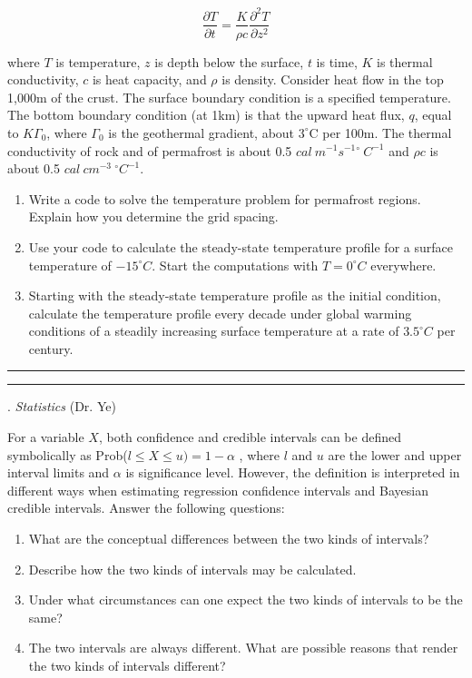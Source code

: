 \documentclass [11point]{article}
\begin{document}
$$\frac{\partial T}{\partial t} = \frac{K}{\rho c} \frac{\partial^2 T}{\partial z^2} $$

where $T$ is temperature, $z$ is depth below the surface, $t$ is time, $K$ is thermal conductivity,
$c$ is heat capacity, and $\rho$ is density. Consider heat flow in the top 1,000m of the crust. The
surface boundary condition is a specified temperature. The bottom boundary condition (at
1km) is that the upward heat flux, $q$, equal to $K \Gamma_0$, where $\Gamma_0$ is the geothermal gradient, about $3^\circ$C per 100m. The thermal conductivity of rock and of permafrost is about 0.5 $cal~m^{-1} s^{-1} {}^\circ~C^{-1}$ and $\rho c$ is about 0.5 $cal~cm^{-3}~{}^\circ C^{-1}$.

\begin{enumerate}
\item Write a code to solve the temperature problem for permafrost regions. Explain
how you determine the grid spacing.
\item Use your code to calculate the steady-state temperature profile for a surface
temperature of $-15^\circ C$. Start the computations with $T=0^\circ C$ everywhere.
\item Starting with the steady-state temperature profile as the initial condition, calculate
the temperature profile every decade under global warming conditions of a
steadily increasing surface temperature at a rate of $3.5^\circ C$ per century.
\end{enumerate}


\bigskip
\hrule 

\pagebreak
\hrule 
{}. \textit{Statistics} (Dr. Ye)

\bigskip
For a variable $X$, both confidence and credible intervals can be defined symbolically as Prob($l \le X \le u) =  1 - \alpha$ , where $l$ and $u$ are the lower and upper interval limits and $\alpha$ is significance level. However, the definition is interpreted in different ways when estimating regression confidence intervals and Bayesian credible intervals. Answer the following questions:

\begin{enumerate}
\item What are the conceptual differences between the two kinds of intervals?
\item Describe how the two kinds of intervals may be calculated.
\item Under what circumstances can one expect the two kinds of intervals to be the same?
\item The two intervals are always different. What are possible reasons that render the two kinds of intervals different?
\end{enumerate}
\end{document}

